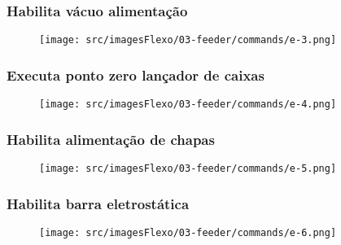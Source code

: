 \newpage
\thispagestyle{fancy}
\vspace*{40 pt}
\subsubsection{\small{Habilita vácuo alimentação}}\label{telaComandoAlimentacaoHabilitaVacioAlimentacao}
\vspace*{\fill}
\begin{figure}[h]
  \centering
  \texttt{[image: src/imagesFlexo/03-feeder/commands/e-3.png]}
\end{figure}
\vspace*{\fill}

\newpage
\thispagestyle{fancy}
\vspace*{40 pt}
\subsubsection{\small{Executa ponto zero lançador de caixas}}\label{telaComandoAlimentacaoExecutaPontoZeroLancadorDeCaixas}
\vspace*{\fill}
\begin{figure}[h]
  \centering
  \texttt{[image: src/imagesFlexo/03-feeder/commands/e-4.png]}
\end{figure}
\vspace*{\fill}

\newpage
\thispagestyle{fancy}
\vspace*{40 pt}
\subsubsection{\small{Habilita alimentação de chapas}}\label{telaComandoAlimentacaoHabilitaAlimentacaoDeChapas}
\vspace*{\fill}
\begin{figure}[h]
  \centering
  \texttt{[image: src/imagesFlexo/03-feeder/commands/e-5.png]}
\end{figure}
\vspace*{\fill}

\newpage
\thispagestyle{fancy}
\vspace*{40 pt}
\subsubsection{\small{Habilita barra eletrostática}}\label{telaComandoAlimentacaoHabilitaBarraEletrostatica}
\vspace*{\fill}
\begin{figure}[h]
  \centering
  \texttt{[image: src/imagesFlexo/03-feeder/commands/e-6.png]}
\end{figure}
\vspace*{\fill}